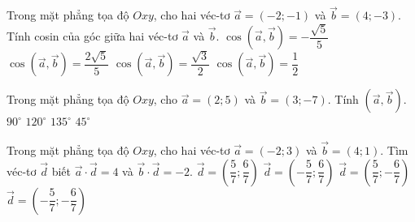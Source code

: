 \begin{ex}%
	Trong mặt phẳng tọa độ $Oxy$, cho hai véc-tơ $\overrightarrow{a}=\left(-2;-1\right)$ và $\overrightarrow{b}=\left(4;-3\right)$. Tính cosin của góc giữa hai véc-tơ $\overrightarrow{a}$ và $\overrightarrow{b}$. 
	\choice
	{\True $\cos\left(\overrightarrow{a},\overrightarrow{b}\right)=-\dfrac{\sqrt{5}}{5}$}
	{$\cos\left(\overrightarrow{a},\overrightarrow{b}\right)=\dfrac{2\sqrt{5}}{5}$}
	{$\cos\left(\overrightarrow{a},\overrightarrow{b}\right)=\dfrac{\sqrt{3}}{2}$}
	{$\cos\left(\overrightarrow{a},\overrightarrow{b}\right)=\dfrac{1}{2}$}
\end{ex}
\begin{ex}%
	Trong mặt phẳng tọa độ $Oxy$, cho $\overrightarrow{a}=(2;5)$ và $\overrightarrow{b}=(3;-7)$. Tính $\left(\overrightarrow{a},\overrightarrow{b}\right)$.
	\choice
	{$90^{\circ}$}
	{$120^{\circ}$}
	{\True $135^{\circ}$}
	{$45^{\circ}$}
\end{ex}

\begin{ex}%
	Trong mặt phẳng tọa độ $Oxy$, cho hai véc-tơ $\overrightarrow{a}=\left(-2;3\right)$ và $\overrightarrow{b}=\left(4;1\right)$. Tìm véc-tơ $\overrightarrow{d} $ biết $\overrightarrow{a} \cdot \overrightarrow{d}=4$ và $\overrightarrow{b} \cdot \overrightarrow{d}=-2$. 
	\choice
	{$\overrightarrow{d}=\left(\dfrac{5}{7};\dfrac{6}{7}\right)$}
	{\True $\overrightarrow{d}=\left(-\dfrac{5}{7};\dfrac{6}{7}\right)$}
	{$\overrightarrow{d}=\left(\dfrac{5}{7};-\dfrac{6}{7}\right)$}
	{$\overrightarrow{d}=\left(-\dfrac{5}{7};-\dfrac{6}{7}\right)$}
\end{ex}

